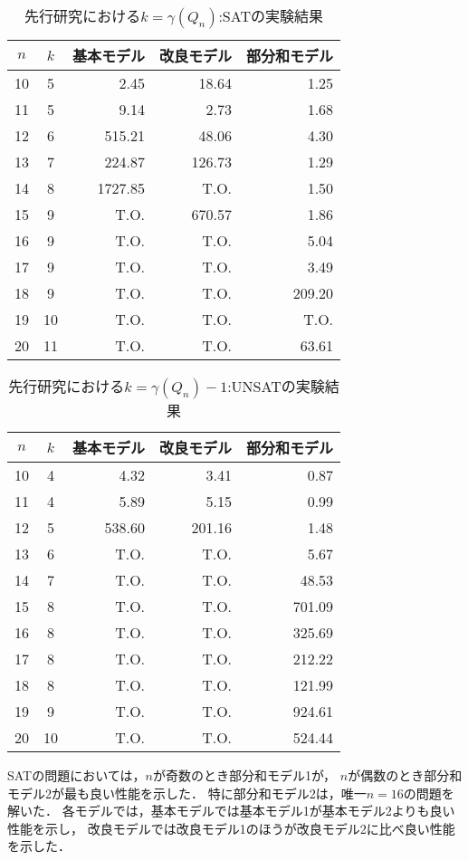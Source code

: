 \begin{table}[ht]
 \caption{先行研究\cite{yamamoto21}における$k=\gamma(Q_n)$:SATの実験結果}
 \label{tb:exyamamotoSAT}
 \centering
 \begin{tabular}{c|c|r|r|r} \hline
  $n$ & $k$ & 基本モデル & 改良モデル & 部分和モデル \\ \hline
  10 & 5 & 2.45 & 18.64 & 1.25 \\ \hline
  11 & 5 & 9.14 & 2.73 & 1.68 \\ \hline
  12 & 6 & 515.21 & 48.06 & 4.30 \\ \hline
  13 & 7 & 224.87 & 126.73 & 1.29 \\ \hline
  14 & 8 & 1727.85 & T.O. & 1.50 \\ \hline
  15 & 9 & T.O. & 670.57 & 1.86 \\ \hline
  16 & 9 & T.O. & T.O. & 5.04 \\ \hline
  17 & 9 & T.O. & T.O. & 3.49 \\ \hline
  18 & 9 & T.O. & T.O. & 209.20 \\ \hline
  19 & 10 & T.O. & T.O. & T.O. \\ \hline
  20 & 11 & T.O. & T.O. & 63.61 \\ \hline
 \end{tabular}
\end{table}
\begin{table}[ht]
 \caption{先行研究\cite{yamamoto21}における$k=\gamma(Q_n)-1$:UNSATの実験結果}
 \label{tb:exyamamotoUNSAT}
 \centering
 \begin{tabular}{c|c|r|r|r} \hline
  $n$ & $k$ & 基本モデル & 改良モデル & 部分和モデル \\ \hline
  10 & 4 & 4.32 & 3.41 & 0.87 \\ \hline
  11 & 4 & 5.89 & 5.15 & 0.99 \\ \hline
  12 & 5 & 538.60 & 201.16 & 1.48 \\ \hline
  13 & 6 & T.O. & T.O. & 5.67 \\ \hline
  14 & 7 & T.O. & T.O. & 48.53 \\ \hline
  15 & 8 & T.O. & T.O. & 701.09 \\ \hline
  16 & 8 & T.O. & T.O. & 325.69 \\ \hline
  17 & 8 & T.O. & T.O. & 212.22 \\ \hline
  18 & 8 & T.O. & T.O. & 121.99 \\ \hline
  19 & 9 & T.O. & T.O. & 924.61 \\ \hline
  20 & 10 & T.O. & T.O. & 524.44 \\ \hline
 \end{tabular}
\end{table}
\newpage
SATの問題においては，$n$が奇数のとき部分和モデル1が，
$n$が偶数のとき部分和モデル2が最も良い性能を示した．
特に部分和モデル2は，唯一$n=16$の問題を解いた．
各モデルでは，基本モデルでは基本モデル1が基本モデル2よりも良い性能を示し，
改良モデルでは改良モデル1のほうが改良モデル2に比べ良い性能を示した．

